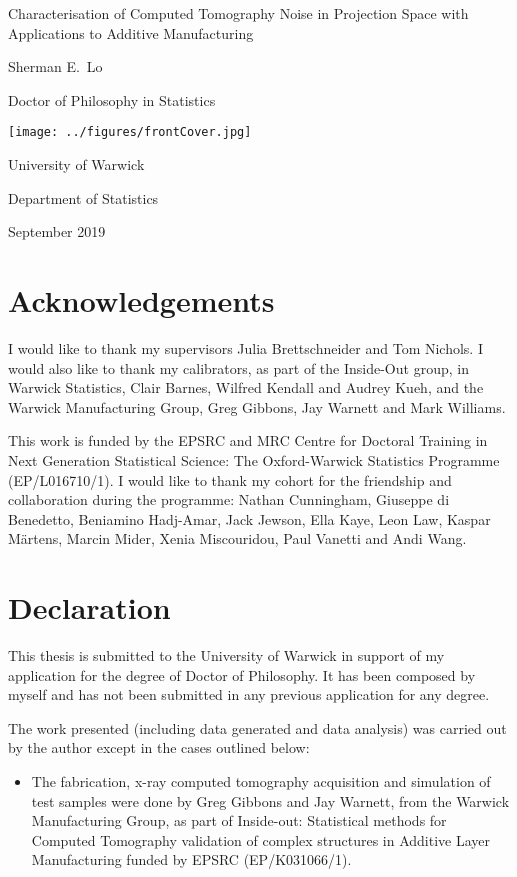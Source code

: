 \documentclass[12pt, a4paper]{memoir}
\begin{document}
\sloppy

\begin{titlingpage}
\centering
{\LARGE Characterisation of Computed Tomography Noise in Projection Space with Applications to Additive Manufacturing \par}
\vspace{1cm}
{\Large Sherman E.~Lo\par}
{\Large Doctor of Philosophy in Statistics\par}
\vfill
\texttt{[image: ../figures/frontCover.jpg]}
\vfill
{\Large University of Warwick\par}
{\Large Department of Statistics\par}
{\Large September 2019\par}
\end{titlingpage}


\frontmatter

\newpage
\tableofcontents*
\newpage
\listoffigures
\newpage
\listoftables

\chapter{Acknowledgements}
I would like to thank my supervisors Julia Brettschneider and Tom Nichols. I would also like to thank my calibrators, as part of the Inside-Out group, in Warwick Statistics, Clair Barnes, Wilfred Kendall and Audrey Kueh, and the Warwick Manufacturing Group, Greg Gibbons, Jay Warnett and Mark Williams.

This work is funded by the EPSRC and MRC Centre for Doctoral Training in Next Generation Statistical Science: The Oxford-Warwick Statistics Programme (EP/L016710/1). I would like to thank my cohort for the friendship and collaboration during the programme: Nathan Cunningham, Giuseppe di Benedetto, Beniamino Hadj-Amar, Jack Jewson, Ella Kaye, Leon Law, Kaspar M\"{a}rtens, Marcin Mider, Xenia Miscouridou, Paul Vanetti and Andi Wang.

\chapter{Declaration}
This thesis is submitted to the University of Warwick in support of my application for the degree of Doctor of Philosophy. It has been composed by myself and has not been submitted in any previous application for any degree.

The work presented (including data generated and data analysis) was carried out by the author except in the cases outlined below:
\begin{itemize}
  \item The fabrication, x-ray computed tomography acquisition and simulation of test samples were done by Greg Gibbons and Jay Warnett, from the Warwick Manufacturing Group, as part of Inside-out: Statistical methods for Computed Tomography validation of complex structures in Additive Layer Manufacturing funded by EPSRC (EP/K031066/1).
\end{itemize}
\end{document}
